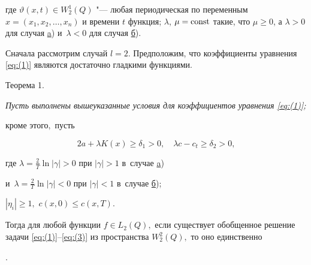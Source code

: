 где  $ \vartheta (x,t) \in W_{2}^{1}(Q)$ "--- любая периодическая по переменным $ x=(x_1, x_2, \dots, x_n)$ и времени $t$ функция; $\lambda$, $\mu = \rm const$ такие, что  $\mu \ge 0$, а $\lambda >0$ для случая \hyperlink{dzh:a}{a}) и~$\lambda <0$ для случая \hyperlink{dzh:b}{б}).



\smallskip






Сначала рассмотрим случай $l=2$. Предположим, что коэффициенты уравнения \eqref{eq:(1)} являются  достаточно гладкими функциями.



\smallskip



\hypertarget{dzh:th1}{}



{\small\sc Теорема 1.}

{\it Пусть выполнены вышеуказанные условия для коэффициентов уравнения \eqref{eq:(1)}{\rm;} 

кроме этого$,$ пусть 

$$

2a+\lambda K(x)\ge \delta_1 >0, \quad 

\lambda  c- c_t\ge \delta _2>0,

$$ 

где $\lambda =\frac{2}{T}\ln | \gamma  |>0$ при $| \gamma |>1$ в~случае {\rm \hyperlink{dzh:a}{a})}

и~$\lambda =\frac{2}{T}\ln | \gamma  |<0$ при $| \gamma |<1$   в~случае {\rm \hyperlink{dzh:b}{б});} 

$| \eta_i  |\ge 1,$ $c(x,0)\le c(x,T).$

Тогда для любой функции  $f\in {{L}_{2}}(Q),$ если существует    обобщенное решение задачи \eqref{eq:(1)}--\eqref{eq:(3)}  из пространства $W_{2}^{2}(Q),$ то оно единственно}.





\smallskip



